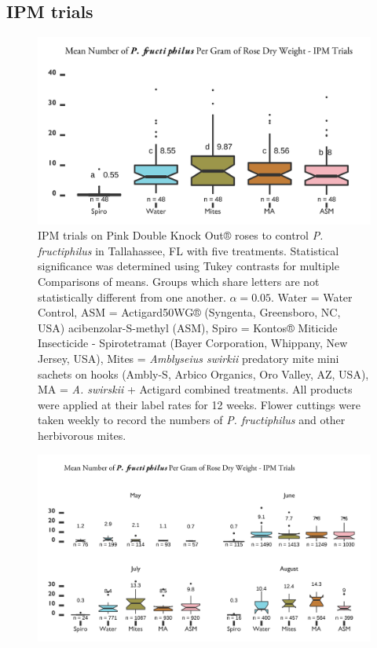 \documentclass{ufdissertation}[overrideChapters] %
\begin{document}
{{\subsection{IPM trials}\label{ipm-trials}}
\begin{figure}

{\centering \includegraphics[width=1\linewidth]{figure/rrv_ipm_graph_erios_talla} 

}

\caption[IPM trials on Pink Double Knock Out® roses to control \textit{P. fructiphilus} in Tallahassee, FL with five treatments]{IPM trials on Pink Double Knock Out® roses to control \textit{P. fructiphilus} in Tallahassee, FL with five treatments. Statistical significance was determined using Tukey contrasts for multiple Comparisons of means. Groups which share letters are not statistically different from one another. $\alpha = 0.05$. Water = Water Control, ASM = Actigard50WG® (Syngenta, Greensboro, NC, USA) acibenzolar-S-methyl (ASM), Spiro = Kontos® Miticide Insecticide - Spirotetramat (Bayer Corporation, Whippany, New Jersey, USA), Mites = \textit{Amblyseius swirkii} predatory mite mini sachets on hooks (Ambly-S, Arbico Organics, Oro Valley, AZ, USA), MA = \textit{A. swirskii} + Actigard combined treatments. All products were applied at their label rates for 12 weeks. Flower cuttings were taken weekly to record the numbers of \textit{P. fructiphilus} and other herbivorous mites.}\label{fig:ipm-talla-erios}
\end{figure}
\begin{figure}

{\centering \includegraphics[width=1\linewidth]{figure/rrv_ipm_graph_erios_talla_month} 

}
\end{figure}}
\end{document}
